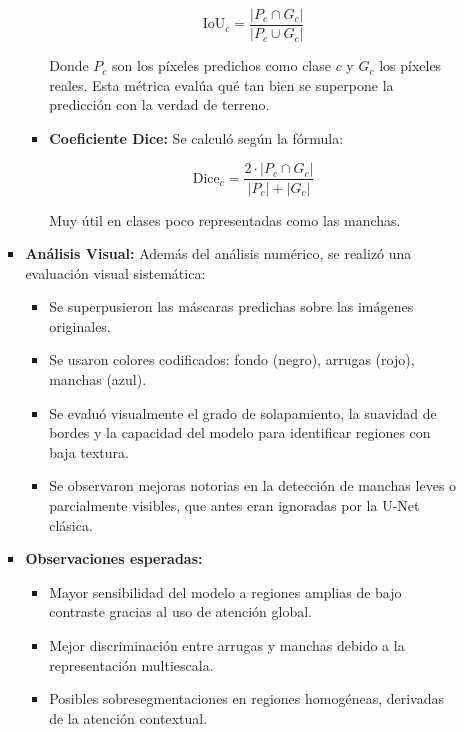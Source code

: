 \begin{enumerate}
\begin{itemize}
\begin{itemize}
\begin{itemize}
    \begin{equation}\label{eq:iou_clase_mit}
    \text{IoU}_c = \frac{|P_c \cap G_c|}{|P_c \cup G_c|}
    \end{equation}
    
    Donde $P_c$ son los píxeles predichos como clase $c$ y $G_c$ los píxeles reales. Esta métrica evalúa qué tan bien se superpone la predicción con la verdad de terreno.
    
    \item \textbf{Coeficiente Dice:}
    Se calculó según la fórmula:
    
    \begin{equation}\label{eq:dice_clase_mit}
    \text{Dice}_c = \frac{2 \cdot |P_c \cap G_c|}{|P_c| + |G_c|}
    \end{equation}
    
    Muy útil en clases poco representadas como las manchas.
    
    \end{itemize}
    
    \item \textbf{Análisis Visual:}
    Además del análisis numérico, se realizó una evaluación visual sistemática:
    
    \begin{itemize}
    \item Se superpusieron las máscaras predichas sobre las imágenes originales.
    \item Se usaron colores codificados: fondo (negro), arrugas (rojo), manchas (azul).
    \item Se evaluó visualmente el grado de solapamiento, la suavidad de bordes y la capacidad del modelo para identificar regiones con baja textura.
    \item Se observaron mejoras notorias en la detección de manchas leves o parcialmente visibles, que antes eran ignoradas por la U-Net clásica.
    \end{itemize}
    
    \item \textbf{Observaciones esperadas:}
    \begin{itemize}
    \item Mayor sensibilidad del modelo a regiones amplias de bajo contraste gracias al uso de atención global.
    \item Mejor discriminación entre arrugas y manchas debido a la representación multiescala.
    \item Posibles sobresegmentaciones en regiones homogéneas, derivadas de la atención contextual.
    \end{itemize}
    

\end{itemize}
\end{itemize}
\end{enumerate}
